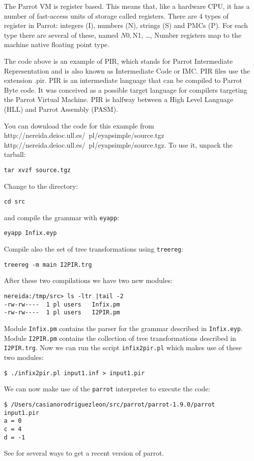 The Parrot VM is register based. This means that, like a hardware
CPU, it has a number of fast-access units of storage called registers.
There are 4 types of register in Parrot: integers (I), numbers (N),
strings (S) and PMCs (P). For each type there are several of these, named
$N0,$N1, \ldots , Number registers map
to the machine native floating point type. 

The code above is an example of PIR, which stands for 
Parrot Intermediate Representation and is also known as
Intermediate Code or IMC. PIR files use the extension .pir.
PIR is an intermediate language that can be compiled to
Parrot Byte code. It was conceived as a possible target language for compilers
targeting the Parrot Virtual Machine. PIR is halfway between a High
Level Language (HLL) and Parrot Assembly (PASM).

You can download the code for this example from
\htmladdnormallink
{http://nereida.deioc.ull.es/~pl/eyapsimple/source.tgz}
{http://nereida.deioc.ull.es/~pl/eyapsimple/source.tgz}.
To use it, unpack the tarball:
\begin{verbatim}
tar xvzf source.tgz
\end{verbatim}
Change to the directory:
\begin{verbatim}
cd src
\end{verbatim}
and compile the grammar with \verb|eyapp|:
\begin{verbatim}
eyapp Infix.eyp
\end{verbatim}
Compile also the set of tree transformations using \verb|treereg|:
\begin{verbatim}
treereg -m main I2PIR.trg
\end{verbatim}
After these two compilations we have two new modules:
\begin{verbatim}
nereida:/tmp/src> ls -ltr |tail -2
-rw-rw----  1 pl users   Infix.pm
-rw-rw----  1 pl users   I2PIR.pm
\end{verbatim}
Module \verb|Infix.pm| contains the parser for the grammar described in \verb|Infix.eyp|.
Module \verb|I2PIR.pm| contains the collection of tree transformations described
in \verb|I2PIR.trg|. Now we can run the script \verb|infix2pir.pl| which makes use of these
two modules:
\begin{verbatim}
$ ./infix2pir.pl input1.inf > input1.pir
\end{verbatim}
We can now make use of the \verb|parrot| interpreter to execute the code:
\begin{verbatim}
$ /Users/casianorodriguezleon/src/parrot/parrot-1.9.0/parrot input1.pir 
a = 0
c = 4
d = -1
\end{verbatim}

See  
for several ways to get a recent version of parrot.

